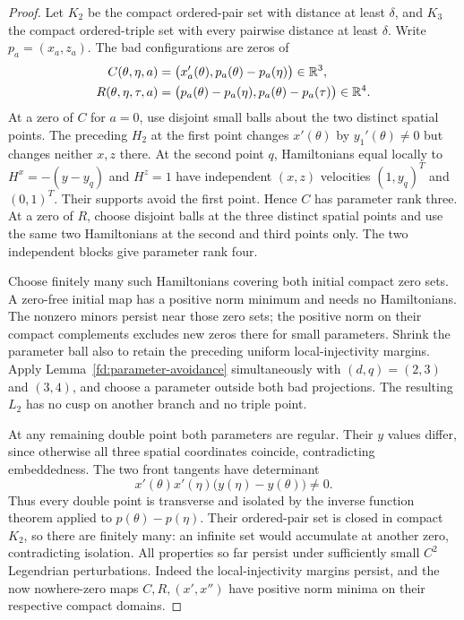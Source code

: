\begin{proof}
Let $K_2$ be the compact ordered-pair set with distance at least $\delta$,
and $K_3$ the compact ordered-triple set with every pairwise distance at
least $\delta$. Write $p_a=(x_a,z_a)$. The bad configurations are zeros of
\begin{align}
 C(\theta,\eta,a)&=
  \bigl(x_a'(\theta),p_a(\theta)-p_a(\eta)\bigr)\in\mathbb R^3,
 \\
 R(\theta,\eta,\tau,a)&=
  \bigl(p_a(\theta)-p_a(\eta),p_a(\theta)-p_a(\tau)\bigr)\in\mathbb R^4.
\end{align}
At a zero of $C$ for $a=0$, use disjoint small balls about the two
distinct spatial points. The preceding $H_2$ at the first point
changes $x'(\theta)$ by $y_1'(\theta)\ne0$ but changes neither $x,z$
there. At the second point $q$, Hamiltonians equal locally to
$H^x=-(y-y_q)$ and $H^z=1$ have independent $(x,z)$ velocities
$(1,y_q)^T$ and $(0,1)^T$. Their supports avoid the first point.
Hence $C$ has parameter rank three. At a zero of $R$, choose disjoint
balls at the three distinct spatial points and use the same two
Hamiltonians at the second and third points only. The two independent
blocks give parameter rank four.

Choose finitely many such Hamiltonians covering both initial compact
zero sets. A zero-free initial map has a positive norm minimum and
needs no Hamiltonians. The nonzero minors persist near those zero
sets; the positive norm on their compact complements excludes new
zeros there for small parameters. Shrink the parameter ball also to
retain the preceding uniform local-injectivity margins. Apply
Lemma~\ref{fd:parameter-avoidance} simultaneously with $(d,q)=(2,3)$
and $(3,4)$, and choose a parameter outside both bad projections.
The resulting $L_2$ has no cusp on another branch and no triple point.

At any remaining double point both parameters are regular. Their
$y$ values differ, since otherwise all three spatial coordinates
coincide, contradicting embeddedness. The two front tangents have
determinant
\begin{equation}
 x'(\theta)x'(\eta)\bigl(y(\eta)-y(\theta)\bigr)\ne0.
\end{equation}
Thus every double point is transverse and isolated by the inverse
function theorem applied to $p(\theta)-p(\eta)$. Their ordered-pair
set is closed in compact $K_2$, so there are finitely many: an infinite
set would accumulate at another zero, contradicting isolation.
All properties so far persist under sufficiently small $C^2$
Legendrian perturbations. Indeed the local-injectivity margins persist,
and the now nowhere-zero maps $C,R,(x',x'')$ have positive norm minima
on their respective compact domains.


\end{proof}
